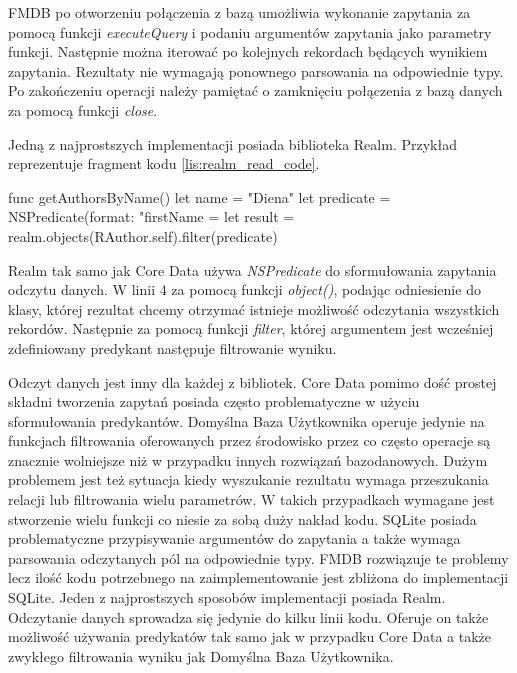 FMDB po otworzeniu połączenia z bazą umożliwia wykonanie zapytania za pomocą funkcji \textit{executeQuery} i podaniu argumentów zapytania jako parametry funkcji. Następnie można iterować po kolejnych rekordach będących wynikiem zapytania. Rezultaty nie wymagają ponownego parsowania na odpowiednie typy. Po zakończeniu operacji należy pamiętać o zamknięciu połączenia z bazą danych za pomocą funkcji \textit{close}. 

Jedną z najprostszych implementacji posiada biblioteka Realm. Przykład reprezentuje fragment kodu \ref{lis:realm_read_code}.

\begin{code}[
		language=swift,
		caption={Przykład odczytu danych Realm},
		label={lis:realm_read_code},
	]
    func getAuthorsByName() {
        let name = "Diena"
        let predicate = NSPredicate(format: "firstName = %
        let result = realm.objects(RAuthor.self).filter(predicate)
    }
\end{code}

Realm tak samo jak Core Data używa \textit{NSPredicate} do sformułowania zapytania odczytu danych. W linii 4 za pomocą funkcji \textit{object()}, podając odniesienie do klasy, której rezultat chcemy otrzymać istnieje możliwość odczytania wszystkich rekordów. Następnie za pomocą funkcji \textit{filter}, której argumentem jest wcześniej zdefiniowany predykant następuje filtrowanie wyniku. 

Odczyt danych jest inny dla każdej z bibliotek. Core Data pomimo dość prostej składni tworzenia zapytań posiada często problematyczne w użyciu sformułowania predykantów. Domyślna Baza Użytkownika operuje jedynie na funkcjach filtrowania oferowanych przez środowisko przez co często operacje są znacznie wolniejsze niż w przypadku innych rozwiązań bazodanowych. Dużym problemem jest też sytuacja kiedy wyszukanie rezultatu wymaga przeszukania relacji lub filtrowania wielu parametrów. W takich przypadkach wymagane jest stworzenie wielu funkcji co niesie za sobą duży nakład kodu. SQLite posiada problematyczne przypisywanie argumentów do zapytania a także wymaga parsowania odczytanych pól na odpowiednie typy. FMDB rozwiązuje te problemy lecz ilość kodu potrzebnego na zaimplementowanie jest zbliżona do implementacji SQLite. Jeden z najprostszych sposobów implementacji posiada Realm. Odczytanie danych sprowadza się jedynie do kilku linii kodu. Oferuje on także możliwość używania predykatów tak samo jak w przypadku Core Data a także zwykłego filtrowania wyniku jak Domyślna Baza Użytkownika.


